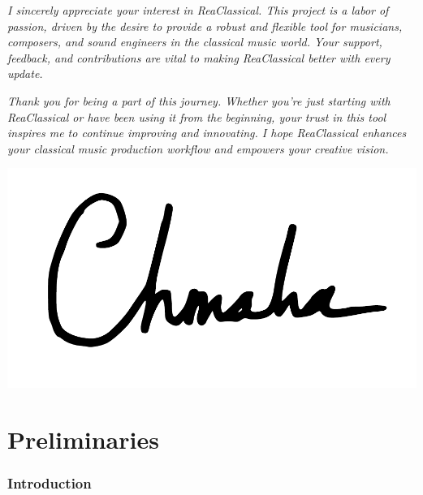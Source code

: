 \documentclass[10pt,american]{article}
\begin{document}
\vspace*{\fill}

\pagebreak{}

\vspace*{\fill}


\emph{I sincerely appreciate your interest in ReaClassical. This project is a
labor of passion, driven by the desire to provide a robust and flexible tool for
musicians, composers, and sound engineers in the classical music world. Your
support, feedback, and contributions are vital to making ReaClassical better
with every update.}

\emph{Thank you for being a part of this journey. Whether you're just starting
with ReaClassical or have been using it from the beginning, your trust in this
tool inspires me to continue improving and innovating. I hope ReaClassical
enhances your classical music production workflow and empowers your creative
vision.}

\begin{flushright}
\includegraphics[scale=0.25]{user_guide_images/chmaha}
\par\end{flushright}

\vspace*{\fill}\pagebreak{}

\pagebreak{}

\tableofcontents{}\pagebreak{}

\part{Preliminaries }

\section{Introduction}
\end{document}
